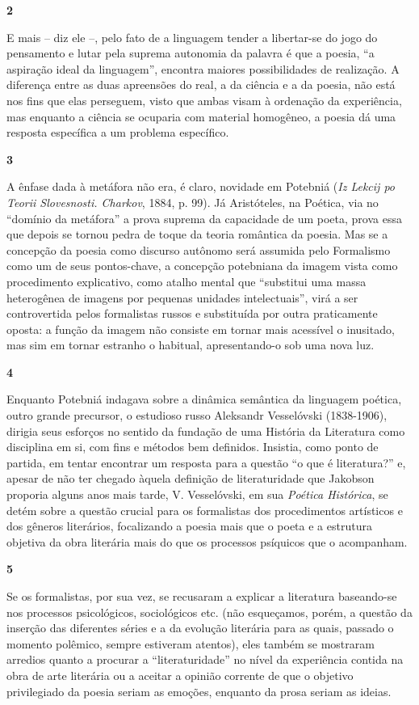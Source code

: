 \textbf{2}

E mais -- diz ele --, pelo fato de a linguagem tender a libertar-se do
jogo do pensamento e lutar pela suprema autonomia da palavra é que a
poesia, ``a aspiração ideal da linguagem'', encontra maiores
possibilidades de realização. A diferença entre as duas apreensões do
real, a da ciência e a da poesia, não está nos fins que elas perseguem,
visto que ambas visam à ordenação da experiência, mas enquanto a ciência
se ocuparia com material homogêneo, a poesia dá uma resposta específica
a um problema específico.

\textbf{3}

A ênfase dada à metáfora não era, é claro, novidade em Potebniá
(\emph{Iz Lekcij po Teorii Slovesnosti. Charkov}, 1884, p. 99). Já
Aristóteles, na Poética, via no ``domínio da metáfora'' a prova suprema
da capacidade de um poeta, prova essa que depois se tornou pedra de
toque da teoria romântica da poesia. Mas se a concepção da poesia como
discurso autônomo será assumida pelo Formalismo como um de seus
pontos-chave, a concepção potebniana da imagem vista como procedimento
explicativo, como atalho mental que ``substitui uma massa heterogênea de
imagens por pequenas unidades intelectuais'', virá a ser controvertida
pelos formalistas russos e substituída por outra praticamente oposta: a
função da imagem não consiste em tornar mais acessível o inusitado, mas
sim em tornar estranho o habitual, apresentando-o sob uma nova luz.

\textbf{4}

Enquanto Potebniá indagava sobre a dinâmica semântica da linguagem
poética, outro grande precursor, o estudioso russo Aleksandr Vesselóvski
(1838-1906), dirigia seus esforços no sentido da fundação de uma
História da Literatura como disciplina em si, com fins e métodos bem
definidos. Insistia, como ponto de partida, em tentar encontrar um
resposta para a questão ``o que é literatura?'' e, apesar de não ter
chegado àquela definição de literaturidade que Jakobson proporia alguns
anos mais tarde, V. Vesselóvski, em sua \emph{Poética Histórica}, se
detém sobre a questão crucial para os formalistas dos procedimentos
artísticos e dos gêneros literários, focalizando a poesia mais que o
poeta e a estrutura objetiva da obra literária mais do que os processos
psíquicos que o acompanham.

\textbf{5}

Se os formalistas, por sua vez, se recusaram a explicar a literatura
baseando-se nos processos psicológicos, sociológicos etc. (não
esqueçamos, porém, a questão da inserção das diferentes séries e a da
evolução literária para as quais, passado o momento polêmico, sempre
estiveram atentos), eles também se mostraram arredios quanto a procurar
a ``literaturidade'' no nível da experiência contida na obra de arte
literária ou a aceitar a opinião corrente de que o objetivo privilegiado
da poesia seriam as emoções, enquanto da prosa seriam as ideias.

